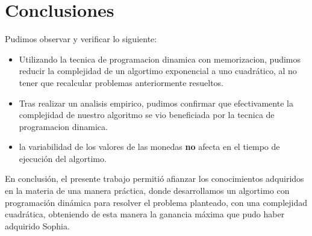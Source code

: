 \section{Conclusiones}

Pudimos observar y verificar lo siguiente:

\begin{itemize}

\item Utilizando la tecnica de programacion dinamica con memorizacion, pudimos reducir la complejidad de un algortimo exponencial a uno cuadrático, al no tener que recalcular problemas anteriormente resueltos.
\item Tras realizar un analisis empirico, pudimos confirmar que efectivamente la complejidad de nuestro algoritmo se vio beneficiada por la tecnica de programacion dinamica.
\item la variabilidad de los valores de las monedas \textbf{no} afecta en el tiempo de ejecución del algortimo.
\end {itemize}

En conclusión, el presente trabajo permitió afianzar los conocimientos adquiridos en la materia de una manera práctica, donde desarrollamos un algortimo con programación dinámica para resolver el problema planteado, con una complejidad cuadrática, obteniendo de esta manera la ganancia máxima que pudo haber adquirido Sophia.